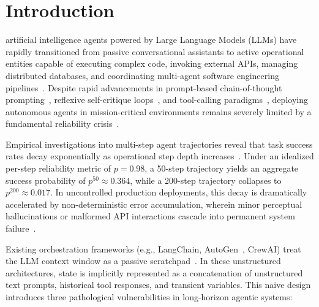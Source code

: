 \documentclass[10pt,journal,compsoc]{IEEEtran}
\begin{document}
\maketitle
\IEEEdisplaynontitleabstractindextext
\IEEEpeerreviewmaketitle

\section{Introduction}
 artificial intelligence agents powered by Large Language Models (LLMs) have rapidly transitioned from passive conversational assistants to active operational entities capable of executing complex code, invoking external APIs, managing distributed databases, and coordinating multi-agent software engineering pipelines~\cite{yao2023react, wang2023voyager, wu2023autogen, jimenez2024swebench}. Despite rapid advancements in prompt-based chain-of-thought prompting~\cite{yao2023react}, reflexive self-critique loops~\cite{shinn2023reflexion}, and tool-calling paradigms~\cite{schick2023toolformer, mialon2023augmented}, deploying autonomous agents in mission-critical environments remains severely limited by a fundamental reliability crisis~\cite{wang2026longhorizon, khanal2026reliability}.

Empirical investigations into multi-step agent trajectories reveal that task success rates decay exponentially as operational step depth increases~\cite{wang2026longhorizon, khanal2026reliability, kambhampati2024cantplan}. Under an idealized per-step reliability metric of $p = 0.98$, a 50-step trajectory yields an aggregate success probability of $p^{50} \approx 0.364$, while a 200-step trajectory collapses to $p^{200} \approx 0.017$. In uncontrolled production deployments, this decay is dramatically accelerated by non-deterministic error accumulation, wherein minor perceptual hallucinations or malformed API interactions cascade into permanent system failure~\cite{wang2026longhorizon, huang2023survey_hallucination}.

Existing orchestration frameworks (e.g., LangChain, AutoGen~\cite{wu2023autogen}, CrewAI) treat the LLM context window as a passive scratchpad~\cite{packer2023memgpt}. In these unstructured architectures, state is implicitly represented as a concatenation of unstructured text prompts, historical tool responses, and transient variables. This naive design introduces three pathological vulnerabilities in long-horizon agentic systems:
\end{document}
